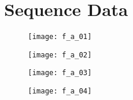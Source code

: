 \chapter{Sequence Data}

\lstset{basicstyle=\footnotesize,breakatwhitespace=true,breaklines=true,frame=single,title=\lstname}

\begin{figure}[h!] \centering \texttt{[image: f\_a\_01]}
    \caption[]{\cite{}}\label{fig:plasmid_pQE30-EC} \end{figure}
\texttt{}

\begin{figure}[h!] \centering \texttt{[image: f\_a\_02]}
    \caption[]{\cite{}}\label{fig:plasmid_pQE30-CE} \end{figure}
\texttt{}

\begin{figure}[h!] \centering \texttt{[image: f\_a\_03]}
    \caption[]{\cite{}}\label{fig:plasmid_pQE30-ECE} \end{figure}
\texttt{}

\begin{figure}[h!] \centering \texttt{[image: f\_a\_04]}
    \caption[]{\cite{}}\label{fig:plasmid_pQE9-COMP} \end{figure}
\texttt{}
